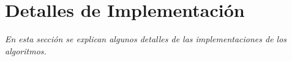 \section{Detalles de Implementaci\'on}

\textsl{En esta secci\'on se explican algunos detalles de las
implementaciones de los algoritmos.}

\vspace*{0.5cm}

